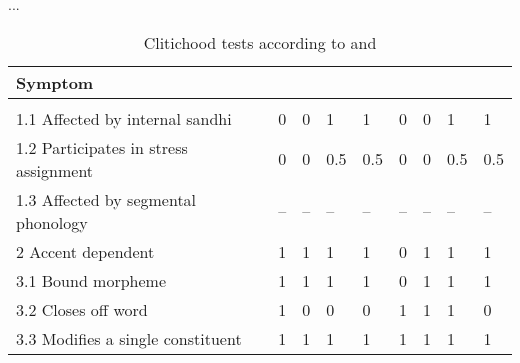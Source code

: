 ...

\begin{table}[p]
\caption{Clitichood tests according to \citet{klavans1985} and 
	\citet{zwicky1985}}
\smaller
\begin{tabu} to \linewidth {H[9l] X[c] X[c] X[c] X[c] X[c] X[c] X[c] X[c]}
\toprule\tableheaderfont

Symptom
	& 
	& 
	& 
	& 
	& 
	& 
	& 
	& 
	\\

\toprule
\tableheaderfont{} \\
\toprule

1.1 Affected by internal sandhi
	& 0	%
	& 0	%
	& 1	%
	& 1	%
	& 0	%
	& 0	%
	& 1	%
	& 1	%
	\\ \midrule

1.2 Participates in stress assignment
	& 0	%
	& 0	%
	& 0.5	%
	& 0.5	%
	& 0	%
	& 0	%
	& 0.5	%
	& 0.5	%
	\\ \midrule

1.3 Affected by segmental phonology
	& --	%
	& --	%
	& --	%
	& --	%
	& --	%
	& --	%
	& --	%
	& --	%
	\\ \midrule

2 Accent dependent
	& 1	%
	& 1	%
	& 1	%
	& 1	%
	& 0	%
	& 1	%
	& 1	%
	& 1	%
	\\ \midrule

3.1 Bound morpheme
	& 1	%
	& 1	%
	& 1	%
	& 1	%
	& 0	%
	& 1	%
	& 1	%
	& 1	%
	\\ \midrule

3.2 Closes off word
	& 1	%
	& 0	%
	& 0	%
	& 0	%
	& 1	%
	& 1	%
	& 1	%
	& 0	%
	\\ \midrule

3.3 Modifies a single constituent
	& 1	%
	& 1	%
	& 1	%
	& 1	%
	& 1	%
	& 1	%
	& 1	%
	& 1	%
	\\ \midrule


\end{tabu}
\end{table}
